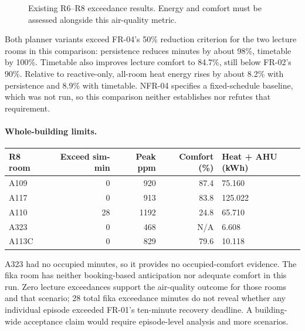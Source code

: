 \documentclass[11pt,a4paper]{article}
\begin{document}
\begin{figure}[htbp]\centering
{}
\caption{Existing R6--R8 exceedance results. Energy and comfort must be assessed alongside this air-quality metric.}\label{fig:results}
\end{figure}
Both planner variants exceed FR-04's 50\% reduction criterion for the two lecture rooms in this comparison: persistence reduces minutes by about 98\%, timetable by 100\%. Timetable also improves lecture comfort to 84.7\%, still below FR-02's 90\%. Relative to reactive-only, all-room heat energy rises by about 8.2\% with persistence and 8.9\% with timetable. NFR-04 specifies a fixed-schedule baseline, which was not run, so this comparison neither establishes nor refutes that requirement.

\paragraph{Whole-building limits.}
\noindent\begin{tabularx}{\linewidth}{lrrrX}\toprule R8 room & Exceed sim-min & Peak ppm & Comfort (\%) & Heat + AHU (kWh)\\\midrule
A109 & 0 & 920 & 87.4 & 75.160\\
A117 & 0 & 913 & 83.8 & 125.022\\
A110 & 28 & 1192 & 24.8 & 65.710\\
A323 & 0 & 468 & N/A & 6.608\\
A113C & 0 & 829 & 79.6 & 10.118\\\bottomrule\end{tabularx}
A323 had no occupied minutes, so it provides no occupied-comfort evidence. The fika room has neither booking-based anticipation nor adequate comfort in this run. Zero lecture exceedances support the air-quality outcome for those rooms and that scenario; 28 total fika exceedance minutes do not reveal whether any individual episode exceeded FR-01's ten-minute recovery deadline. A building-wide acceptance claim would require episode-level analysis and more scenarios.
\end{document}
